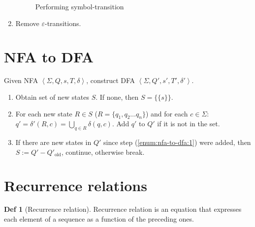 \documentclass[a4paper]{article}
\theoremstyle{definition}
\newtheorem{definition}{Def}
\begin{document}
\begin{enumerate}
\begin{figure}[!htbp]
    \caption{Performing symbol-transition}%
    \label{fig:enfa-to-nfa-3}
  \end{figure}
  \item Remove \(\varepsilon\)-transitions.
\end{enumerate}

\section{NFA to DFA}
Given NFA \(\left< \Sigma, Q, s, T , \delta\right>\),
construct DFA \(\left< \Sigma, Q', s', T' , \delta' \right>\).

\begin{enumerate}
  \item \label{enum:nfa-to-dfa:1} Obtain set of new states \(S\). If none, then
    \(S = \{\{s\}\}\).
  \item For each new state \(R \in S\) (\(R = \{q_1, q_2 \ldots q_n\}\))
     and for each \(c \in \Sigma\):
     \(q' = \delta'(R, c) = \bigcup_{q \in R} \delta(q, c) \).
     Add \(q'\) to \(Q'\) if it is not in the set.
  \item If there are new states in \(Q'\) since step (\ref{enum:nfa-to-dfa:1})
    were added, then \(S := Q' - Q'_{\text{old}}\), continue, otherwise break.
\end{enumerate}

\section{Recurrence relations}

\begin{definition}[Recurrence relation]
  Recurrence relation is an equation
  that expresses each element of a sequence
  as a function of the preceding ones.
\end{definition}
\end{document}
